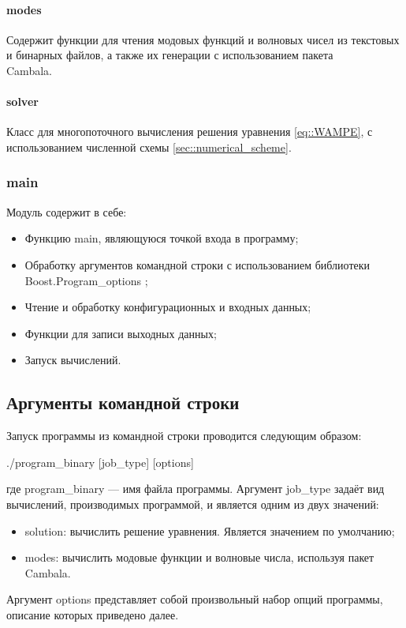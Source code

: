 \documentclass{fefu}
\begin{document}
                \paragraph{modes}
                    \par Содержит функции для чтения модовых функций и волновых чисел из текстовых и бинарных файлов, а также их генерации с использованием пакета\\ Cambala.
                \paragraph{solver}
                    \par Класс для многопоточного вычисления решения уравнения \eqref{eq::WAMPE}, с использованием численной схемы \ref{sec::numerical_scheme}.
            \subsubsection{main}
                \par Модуль содержит в себе:
                \begin{itemize}
                    \item Функцию \textsf{main}, являющуюся точкой входа в программу;
                    \item Обработку аргументов командной строки с использованием библиотеки Boost.Program\_options \cite{boost.program_options};
                    \item Чтение и обработку конфигурационных и входных данных;
                    \item Функции для записи выходных данных;
                    \item Запуск вычислений.
                \end{itemize}
        \subsection{Аргументы командной строки}
            \par Запуск программы из командной строки проводится следующим образом:
            \centerline{./\textsf{program\_binary [job\_type] [options]}}
            где \textsf{program\_binary} --- имя файла программы. Аргумент \textsf{job\_type} задаёт вид вычислений, производимых программой, и является одним из двух значений:
            \begin{itemize}
                \item \textsf{solution}: вычислить решение уравнения. Является значением по умолчанию;
                \item \textsf{modes}: вычислить модовые функции и волновые числа, используя пакет Cambala.
            \end{itemize}
            Аргумент \textsf{options} представляет собой произвольный набор опций программы, описание которых приведено далее.
\end{document}
